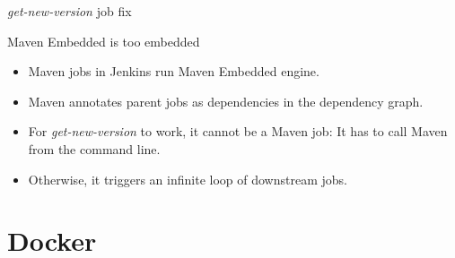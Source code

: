 \documentclass[presentation]{beamer}
\begin{document}
{
\begin{frame}[label=sec-6-9]{}

\begin{columns}
\begin{column}{0.6\textwidth}
\begin{quotation} %

\end{quotation}
\end{column}
\end{columns}
\end{frame}
} %



{
\begin{frame}[label=sec-6-10]{\textit{get-new-version} job fix}

\begin{block}{Maven Embedded is too embedded}

\begin{itemize}
\item Maven jobs in Jenkins run Maven Embedded engine.
\item Maven annotates parent jobs as dependencies in the dependency graph.
\item For \textit{get-new-version} to work, it cannot be a Maven job: It has to call Maven from the command line.
\item Otherwise, it triggers an infinite loop of downstream jobs.
\end{itemize}
\end{block}
\end{frame}
} %


\section{Docker}
\label{sec-7}
\end{document}
